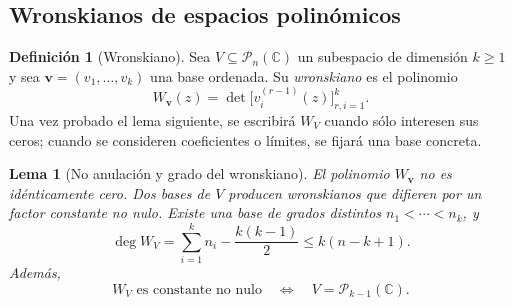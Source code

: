 \documentclass[11pt,a4paper]{article}
\numberwithin{equation}{section}
\newtheorem{lemma}[theorem]{Lema}
\theoremstyle{definition}
\newtheorem{definition}[theorem]{Definición}
\theoremstyle{remark}
\newcommand{\C}{\mathbb C}
\newcommand{\PP}{\mathcal P}
\begin{document}
\subsection{Wronskianos de espacios polinómicos}
\begin{definition}[Wronskiano]\label{def:wronskian}
Sea $V\subseteq\PP_n(\C)$ un subespacio de dimensión $k\ge1$ y sea $\boldsymbol v=(v_1,\ldots,v_k)$ una base ordenada. Su \emph{wronskiano} es el polinomio
\[
W_{\boldsymbol v}(z)=\det\bigl[v_i^{(r-1)}(z)\bigr]_{r,i=1}^k.
\]
Una vez probado el lema siguiente, se escribirá $W_V$ cuando sólo interesen sus ceros; cuando se consideren coeficientes o límites, se fijará una base concreta.
\end{definition}

\begin{lemma}[No anulación y grado del wronskiano]\label{lem:wronskian}
El polinomio $W_{\boldsymbol v}$ no es idénticamente cero. Dos bases de $V$ producen wronskianos que difieren por un factor constante no nulo. Existe una base de grados distintos $n_1<\cdots<n_k$, y
\begin{equation}\label{eq:wdegree}
\deg W_V=\sum_{i=1}^k n_i-\frac{k(k-1)}2
\le k(n-k+1).
\end{equation}
Además,
\begin{equation}\label{eq:wconstant}
W_V\text{ es constante no nulo}\quad\Longleftrightarrow\quad
V=\PP_{k-1}(\C).
\end{equation}
\end{lemma}
\end{document}
